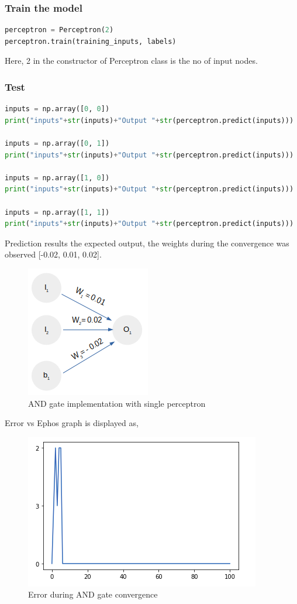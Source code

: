 \documentclass[a4paper,12pt]{report}
\begin{document}
\subsubsection*{Train the model}
\begin{lstlisting}[language=Python]
perceptron = Perceptron(2)
perceptron.train(training_inputs, labels)
\end{lstlisting}
 
Here, 2 in the constructor of Perceptron class is the no of input nodes.


\subsubsection*{Test}
\begin{lstlisting}[language=python]
inputs = np.array([0, 0])
print("inputs"+str(inputs)+"Output "+str(perceptron.predict(inputs)))

inputs = np.array([0, 1])
print("inputs"+str(inputs)+"Output "+str(perceptron.predict(inputs)))

inputs = np.array([1, 0])
print("inputs"+str(inputs)+"Output "+str(perceptron.predict(inputs)))

inputs = np.array([1, 1])
print("inputs"+str(inputs)+"Output "+str(perceptron.predict(inputs)))
\end{lstlisting}
Prediction results the expected output, the weights during the convergence was observed [-0.02, 0.01,  0.02].  

\begin{figure}[htp]
	\centering
	\includegraphics[scale=0.60]{resources/image-10.png}
	\caption{AND gate implementation with single perceptron}
	\label{}
\end{figure}
Error vs Ephos graph is displayed as,
\begin{figure}[htp]
	\centering
	\includegraphics[scale=0.80]{resources/image-09.png}
	\caption{Error during AND gate convergence}
	\label{}
\end{figure}
\end{document}
